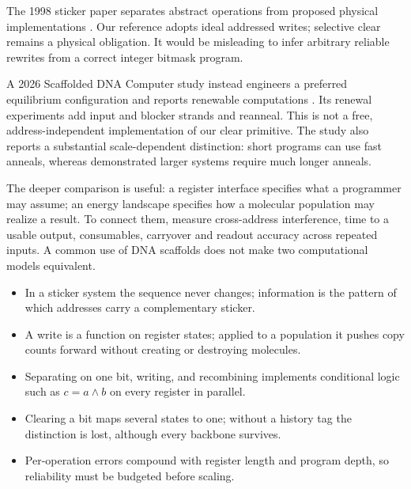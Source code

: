 The 1998 sticker paper separates abstract operations from proposed physical
implementations \cite{Roweis1998}. Our reference adopts ideal addressed writes;
selective clear remains a physical obligation. It would be misleading to
infer arbitrary reliable rewrites from a correct integer bitmask program.

A 2026 Scaffolded DNA Computer study instead engineers a preferred
equilibrium configuration and reports renewable computations \cite{Sterin2026}.
Its renewal experiments add input and blocker strands and reanneal.
This is not a free, address-independent implementation of our clear
primitive. The study also reports a substantial scale-dependent distinction:
short programs can use fast anneals, whereas demonstrated larger systems
require much longer anneals.

The deeper comparison is useful: a register interface specifies what a
programmer may assume; an energy landscape specifies how a molecular
population may realize a result. To connect them, measure cross-address
interference, time to a usable output, consumables, carryover and readout
accuracy across repeated inputs. A common use of DNA scaffolds does not
make two computational models equivalent.

\begin{KeyIdeas}
\begin{itemize}\setlength{\itemsep}{2pt}
\item In a sticker system the sequence never changes; information is the pattern
of which addresses carry a complementary sticker.
\item A write is a function on register states; applied to a population it pushes
copy counts forward without creating or destroying molecules.
\item Separating on one bit, writing, and recombining implements conditional
logic such as $c=a\land b$ on every register in parallel.
\item Clearing a bit maps several states to one; without a history tag the
distinction is lost, although every backbone survives.
\item Per-operation errors compound with register length and program depth, so
reliability must be budgeted before scaling.
\end{itemize}
\end{KeyIdeas}

